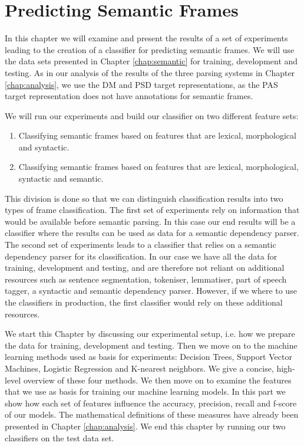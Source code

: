 \chapter{Predicting Semantic Frames}
\label{chap:experiments}

In this chapter we will examine and present the results of a set of experiments leading to the creation of a classifier for predicting semantic frames. We will use the data sets presented in Chapter \ref{chap:semantic} for training, development and testing. As in our analysis of the results of the three parsing systems in Chapter \ref{chap:analysis}, we use the DM and PSD target representations, as the PAS target representation does not have annotations for semantic frames.

We will run our experiments and build our classifier on two different feature sets:

\begin{enumerate}
    \item Classifying semantic frames based on features that are lexical, morphological and syntactic. 
    \item Classifying semantic frames based on features that are lexical, morphological, syntactic and semantic.
\end{enumerate}

This division is done so that we can distinguish classification results into two types of frame classification. The first set of experiments rely on information that would be available before semantic parsing. In this case our end results will be a classifier where the results can be used as data for a semantic dependency parser. The second set of experiments leads to a classifier that relies on a semantic dependency parser for its classification. In our case we have all the data for training, development and testing, and are therefore not reliant on additional resources such as sentence segmentation, tokeniser, lemmatiser, part of speech tagger, a syntactic and semantic dependency parser. However, if we where to use the classifiers in production, the first classifier would rely on these additional resources.

We start this Chapter by discussing our experimental setup, i.e. how we prepare the data for training, development and testing. Then we move on to the machine learning methods used as basis for experiments: Decision Trees, Support Vector Machines, Logistic Regression and K-nearest neighbors. We give a concise, high-level overview of these four methods. We then move on to examine the features that we use as basis for training our machine learning models. In this part we show how each set of features influence the accuracy, precision, recall and f-score of our models. The mathematical definitions of these measures have already been presented in Chapter \ref{chap:analysis}. We end this chapter by running our two classifiers on the test data set.


